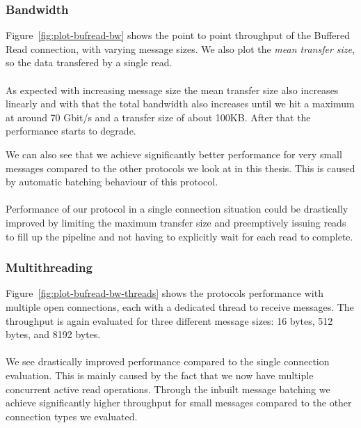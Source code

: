 \subsubsection{Bandwidth}

Figure~\ref{fig:plot-bufread-bw} shows the point to point throughput of the Buffered Read connection, with varying message 
sizes. We also plot the \emph{mean transfer size}, so the data transfered by a single read.

\paragraph{} As expected with increasing message size the mean transfer size also increases linearly and with that the 
total bandwidth also increases until we hit a maximum at around 70 Gbit/s and a transfer size of about 100KB. After that 
the performance starts to degrade. 

We can also see that we achieve significantly better performance for very small messages compared to the other protocols we
look at in this thesis. This is caused by automatic batching behaviour of this protocol.

\paragraph{} Performance of our protocol in a single connection situation could be drastically improved by limiting the 
maximum transfer size and preemptively issuing reads to fill up the pipeline and not having to explicitly wait for each
read to complete.


\subsubsection{Multithreading}

Figure~\ref{fig:plot-bufread-bw-threads} shows the protocols performance with multiple open connections, each with a dedicated
thread to receive messages. The throughput is again evaluated for three different message 
sizes: 16 bytes, 512 bytes, and 8192 bytes. 

\paragraph{} We see drastically improved performance compared to the single connection evaluation. This is mainly caused by
the fact that we now have multiple concurrent active read operations. Through the inbuilt message batching we achieve 
significantly higher throughput for small messages compared to the other connection types we evaluated.

